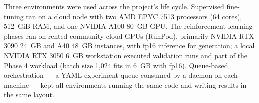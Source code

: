 Three environments were used across the project's life cycle. Supervised fine-tuning ran on a cloud node with two AMD EPYC 7513 processors (64 cores), 512~GiB RAM, and one NVIDIA A100 80~GB GPU. The reinforcement learning phases ran on rented community-cloud GPUs (RunPod), primarily NVIDIA RTX 3090 24~GB and A40 48~GB instances, with fp16 inference for generation; a local NVIDIA RTX 3050 6~GB workstation executed validation runs and part of the Phase 4 workload (batch size 1{,}024 fits in 6~GB with fp16). Queue-based orchestration --- a YAML experiment queue consumed by a daemon on each machine --- kept all environments running the same code and writing results in the same layout.
